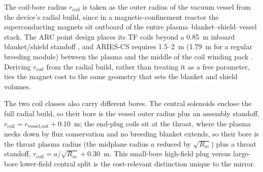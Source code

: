 \documentclass{article}
\begin{document}
The coil-bore radius $r_{\text{coil}}$ is taken as the outer radius of the
vacuum vessel from the device's radial build, since in a magnetic-confinement
reactor the superconducting magnets sit outboard of the entire
plasma--blanket--shield--vessel stack. The ARC point design places its TF
coils beyond a 0.85~m inboard blanket/shield standoff
\citep{sorbom2015arc}, and ARIES-CS requires 1.5--2~m (1.79~m for a regular
breeding module) between the plasma and the middle of the coil winding pack
\citep{najmabadi2008stellarator}. Deriving $r_{\text{coil}}$ from the radial
build, rather than treating it as a free parameter, ties the magnet cost to the
same geometry that sets the blanket and shield volumes.

The two coil classes also carry different bores. The central solenoids enclose
the full radial build, so their bore is the vessel outer radius plus an assembly
standoff, $r_{\text{coil}} = r_{\text{vessel,out}} + 0.10$~m; the end-plug coils
sit at the throat, where the plasma necks down by flux conservation and no
breeding blanket extends, so their bore is the throat plasma radius (the
midplane radius $a$ reduced by $\sqrt{R_m}$) plus a throat standoff,
$r_{\text{coil}} = a/\sqrt{R_m} + 0.30$~m. This small-bore high-field plug
versus large-bore lower-field central split is the cost-relevant distinction
unique to the mirror.
\end{document}
